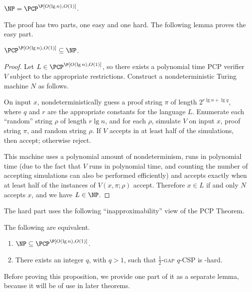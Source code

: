 \documentclass[]{article}
\begin{document}
\begin{theorem}
  $\NP = \PCP^\P[O(\lg n), O(1)]$.
\end{theorem}

The proof has two parts, one easy and one hard.
The following lemma proves the easy part.

\begin{lemma}\label{lem:pcpinnp}
  $\PCP^\P[O(\lg n), O(1)] \subseteq \NP$.
\end{lemma}
\begin{proof}
  Let $L \in \PCP^\P[O(\lg n), O(1)]$, so there exists a polynomial time PCP verifier $V$ subject to the appropriate restrictions.
  Construct a nondeterministic Turing machine $N$ as follows.

  On input $x$, nondeterministically guess a proof string $\pi$ of length $2^{r \lg n + \lg q}$, where $q$ and $r$ are the appropriate constants for the language $L$.
  Enumerate each ``random'' string $\rho$ of length $r \lg  n$, and for each $\rho$, simulate $V$ on input $x$, proof string $\pi$, and random string $\rho$.
  If $V$ accepts in at least half of the simulations, then accept; otherwise reject.

  This machine uses a polynomial amount of nondeterminism, runs in polynomial time (due to the fact that $V$ runs in polynomial time, and counting the number of accepting simulations can also be performed efficiently) and accepts exactly when at least half of the instances of $V(x, \pi; \rho)$ accept.
  Therefore $x \in L$ if and only $N$ accepts $x$, and we have $L \in \NP$.  
\end{proof}

The hard part uses the following ``inapproximability'' view of the PCP Theorem.
\begin{proposition}\label{prop:equivalence}
  The following are equivalent.
  \begin{enumerate}
  \item $\NP \subseteq \PCP^\P[O(\lg n), O(1)]$.
  \item There exists an integer $q$, with $q > 1$, such that \textsc{$\frac{1}{2}$-gap $q$-CSP} is \NP-hard.
  \end{enumerate}
\end{proposition}

Before proving this proposition, we provide one part of it as a separate lemma, because it will be of use in later theorems.
\end{document}

